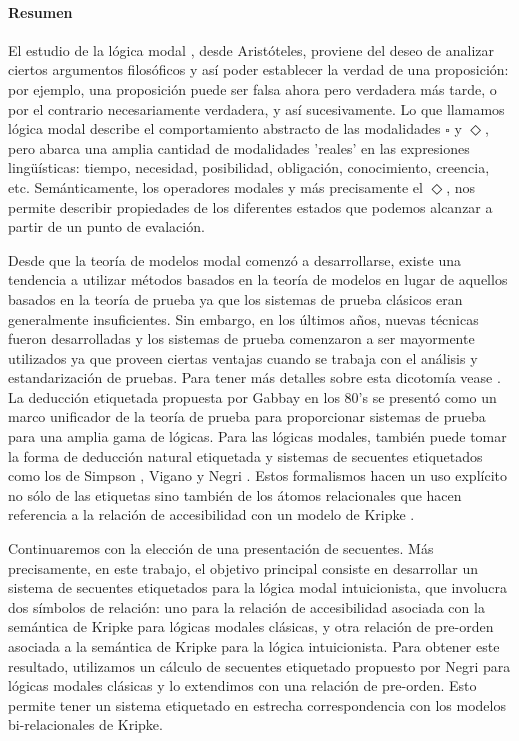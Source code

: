 
\paragraph{Resumen}

El estudio de la lógica modal \cite{blackburn01}, desde Aristóteles, proviene del deseo de analizar ciertos argumentos filosóficos y así poder establecer la verdad de una proposición: por ejemplo, una proposición puede ser falsa ahora pero verdadera más tarde, o por el contrario necesariamente verdadera, y así sucesivamente. Lo que llamamos lógica modal describe el comportamiento abstracto de las modalidades $\square$ y $\Diamond$, pero abarca una amplia cantidad de modalidades 'reales' en las expresiones ling\"{u}ísticas: tiempo, necesidad, posibilidad, obligación, conocimiento, creencia, etc. Semánticamente, los operadores modales y más precisamente el $\Diamond$, nos permite describir propiedades de los diferentes estados que podemos alcanzar a partir de un punto de evalación.

Desde que la teoría de modelos modal comenzó a desarrollarse, existe una tendencia a utilizar métodos basados en la teoría de modelos en lugar de aquellos basados en la teoría de prueba ya que los sistemas de prueba clásicos eran generalmente insuficientes. Sin embargo, en los últimos años, nuevas técnicas fueron desarrolladas y los sistemas de prueba comenzaron a ser mayormente utilizados ya que proveen ciertas ventajas cuando se trabaja con el análisis y estandarización de pruebas. Para tener más detalles sobre esta dicotomía vease \cite{negri2005}. La deducción etiquetada propuesta por Gabbay \cite{gabbay1996} en los 80's se presentó como un marco unificador de la teoría de prueba para proporcionar sistemas de prueba para una amplia gama de lógicas. Para las lógicas modales, también puede tomar la forma de deducción natural etiquetada y sistemas de secuentes etiquetados como los de Simpson \cite{simpson1994}, Vigano \cite{vigano2013} y Negri \cite{negri2005}. Estos formalismos hacen un uso explícito no sólo de las etiquetas sino también de los átomos relacionales que hacen referencia a la relación de accesibilidad con un modelo de Kripke \cite{kripke1959}.

Continuaremos con la elección de una presentación de secuentes. Más precisamente, en este trabajo, el objetivo principal consiste en desarrollar un sistema de secuentes etiquetados para la lógica modal intuicionista, que involucra dos símbolos de relación: uno para la relación de accesibilidad asociada con la semántica de Kripke para lógicas modales clásicas, y otra relación de pre-orden asociada a la semántica de Kripke para la lógica intuicionista. Para obtener este resultado, utilizamos un cálculo de secuentes etiquetado propuesto por Negri \cite{negri2005} para lógicas modales clásicas y lo extendimos con una relación de pre-orden. Esto permite tener un sistema etiquetado en estrecha correspondencia con los modelos bi-relacionales de Kripke.